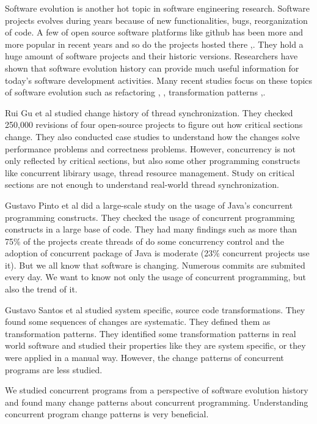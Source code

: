\documentclass[conference]{IEEEtran}
\begin{document}
Software evolution is another hot topic in software engineering research. Software projects evolves during years because of new functionalities, bugs, reorganization of code. A few of open source software platforms like github has been more and more popular in recent years and so do the projects hosted there \cite{conf/icsm/Borges16},\cite{conf/icsm/BorgesHV16}. They hold a huge amount of software projects and their historic versions. Researchers have shown that software evolution history can provide much useful information for today's software development activities. Many recent studies focus on these topics of software evolution such as refactoring \cite{conf/icse/KimBDA16}, \cite{conf/icsm/WahlerDS16}, transformation patterns \cite{conf/wcre/JiangPWXZ15},\cite{conf/icse/MengKM13}.

Rui Gu et al \cite{conf/sigsoft/GuJSZL15} studied change history of thread synchronization. They checked 250,000 revisions of four open-source projects to figure out how critical sections change. They also conducted case studies to understand how the changes solve performance problems and correctness problems. However, concurrency is not only reflected by critical sections, but also some other programming constructs like concurrent libirary usage, thread resource management. Study on critical sections are not enough to understand real-world thread synchronization.

Gustavo Pinto et al \cite{journals/jss/PintoTFFB15} did a large-scale study on the usage of Java’s concurrent programming constructs. They checked the usage of concurrent programming constructs in a large base of code. They had many findings such as more than 75\% of the projects create threads of do some concurrency control and the adoption of concurrent package of Java is moderate (23\% concurrent projects use it). But we all know that software is changing. Numerous commits are submited every day. We want to know not only the usage of concurrent programming, but also the trend of it.

Gustavo Santos et al \cite{conf/icsm/SantosAEDV15} studied system specific, source code transformations. They found some sequences of changes are systematic. They defined them as transformation patterns. They identified some transformation patterns in real world software and studied their properties like they are system specific, or they were applied in a manual way. However, the change patterns of concurrent programs are less studied.

We studied concurrent programs from a perspective of software evolution history and found many change patterns about concurrent programming. Understanding concurrent program change patterns is very beneficial.
\end{document}
